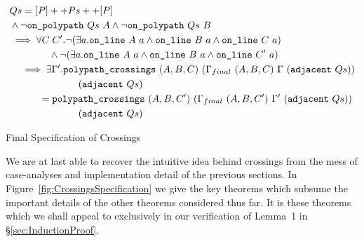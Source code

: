 \begin{boxedfigure}
\begin{multline}\label{eq:changeTriangle}
  \begin{aligned}
    &Qs = [P] ++ Ps ++ [P]\\
    &\wedge \neg\texttt{on\_polypath}\ Qs\ A \wedge \neg\texttt{on\_polypath}\ Qs\ B\\
    &\implies \forall C\;C'. \neg(\exists a.\texttt{on\_line}\ A\ a\wedge \texttt{on\_line}\ B\ a\wedge \texttt{on\_line}\ C\ a)\\
    &\qquad\qquad\wedge \neg(\exists a.\texttt{on\_line}\ A\ a\wedge \texttt{on\_line}\ B\ a\wedge \texttt{on\_line}\ C'\ a)\\
    &\quad\implies \exists \Gamma'. \texttt{polypath\_crossings}\ (A,B,C)\ (\Gamma_{final}\ (A,B,C)\ \Gamma\ (\texttt{adjacent}\ Qs))\\
    &\quad\qquad\qquad\qquad(\texttt{adjacent}\ Qs)\\
    &\quad\qquad = \texttt{polypath\_crossings}\ (A,B,C')\ (\Gamma_{final}\ (A,B,C')\ \Gamma'\ (\texttt{adjacent}\ Qs))\\
    &\quad\qquad\qquad\qquad(\texttt{adjacent}\ Qs)\\
  \end{aligned}
\end{multline}
\caption{Final Specification of Crossings}\label{fig:CrossingsSpecification}
\end{boxedfigure}

We are at last able to recover the intuitive idea behind crossings from the mess of case-analyses and implementation detail of the previous sections. In Figure~\ref{fig:CrossingsSpecification} we give the key theorems which subsume the important details of the other theorems considered thus far. It is these theorems which we shall appeal to exclusively in our verification of Lemma~1 in \S\ref{sec:InductionProof}.


